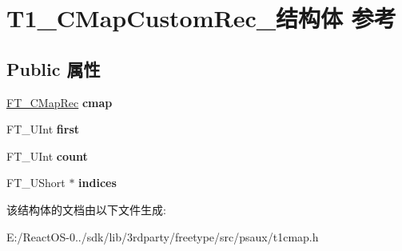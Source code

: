 \hypertarget{struct_t1___c_map_custom_rec__}{}\section{T1\+\_\+\+C\+Map\+Custom\+Rec\+\_\+结构体 参考}
\label{struct_t1___c_map_custom_rec__}
\subsection*{Public 属性}
\begin{DoxyCompactItemize}
\item 
\mbox{\label{struct_t1___c_map_custom_rec___a615069a7d312230c3cda8daa47191e9c}} 
\hyperlink{struct_f_t___c_map_rec__}{F\+T\+\_\+\+C\+Map\+Rec} {\bfseries cmap}
\item 
\mbox{\label{struct_t1___c_map_custom_rec___a5ad454413bf85a3df15122b58dbfcebc}} 
F\+T\+\_\+\+U\+Int {\bfseries first}
\item 
\mbox{\label{struct_t1___c_map_custom_rec___a9e00f7ba5271d4b312d97497c9920f1a}} 
F\+T\+\_\+\+U\+Int {\bfseries count}
\item 
\mbox{\label{struct_t1___c_map_custom_rec___aec1cee313d723bebae65f89358559ef6}} 
F\+T\+\_\+\+U\+Short $\ast$ {\bfseries indices}
\end{DoxyCompactItemize}


该结构体的文档由以下文件生成\+:\begin{DoxyCompactItemize}
\item 
E\+:/\+React\+O\+S-\/0../sdk/lib/3rdparty/freetype/src/psaux/t1cmap.\+h\end{DoxyCompactItemize}
